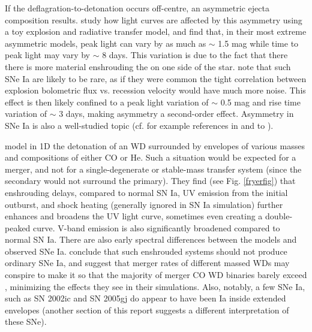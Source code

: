 If the deflagration-to-detonation occurs off-centre, an asymmetric ejecta composition results.  \cite{sim+07} study how light curves are affected by this asymmetry using a toy explosion and radiative transfer model, and find that, in their most extreme asymmetric models, peak light can vary by as much as $\sim$ 1.5 mag while time to peak light may vary by $\sim$ 8 days.  This variation is due to the fact that there there is more material enshrouding the {\Ni} on one side of the star.  \cite{sim+07} note that such SNe Ia are likely to be rare, as if they were common the tight correlation between explosion bolometric flux vs. recession velocity would have much more noise.  This effect is then likely confined to a peak light variation of $\sim$ 0.5 mag and rise time variation of $\sim$ 3 days, making asymmetry a second-order effect.  Asymmetry in SNe Ia is also a well-studied topic (cf. for example references in and to \cite{sim+07}).

\cite{frye+10} model in 1D the detonation of an {\Mchan} WD surrounded by envelopes of various masses and compositions of either CO or He.  Such a situation would be expected for a merger, and not for a single-degenerate  or stable-mass transfer system (since the secondary would not surround the primary).  They find (see Fig. \ref{fryerfig}) that enshrouding delays, compared to normal SN Ia, UV emission from the initial outburst, and shock heating (generally ignored in SN Ia simulation) further enhances and broadens the UV light curve, sometimes even creating a double-peaked curve.  V-band emission is also significantly broadened compared to normal SN Ia.  There are also early spectral differences between the models and observed SNe Ia.  \citeauthor{frye+10} conclude that such enshrouded systems should not produce ordinary SNe Ia, and suggest that merger rates of different massed WDs may conspire to make it so that the majority of merger CO WD binaries barely exceed {\Mchan}, minimizing the effects they see in their simulations.  Also, notably, a few SNe Ia, such as SN 2002ic and SN 2005gj do appear to have been Ia inside extended envelopes (another section of this report suggests a different interpretation of these SNe).

